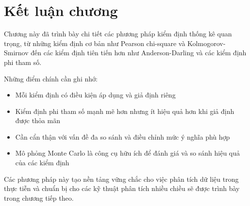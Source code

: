 \section{Kết luận chương}

Chương này đã trình bày chi tiết các phương pháp kiểm định thống kê quan trọng, từ những kiểm định cơ bản như Pearson chi-square và Kolmogorov-Smirnov đến các kiểm định tiên tiến hơn như Anderson-Darling và các kiểm định phi tham số. 

Những điểm chính cần ghi nhớ:
\begin{itemize}
    \item Mỗi kiểm định có điều kiện áp dụng và giả định riêng
    \item Kiểm định phi tham số mạnh mẽ hơn nhưng ít hiệu quả hơn khi giả định được thỏa mãn
    \item Cần cẩn thận với vấn đề đa so sánh và điều chỉnh mức ý nghĩa phù hợp
    \item Mô phỏng Monte Carlo là công cụ hữu ích để đánh giá và so sánh hiệu quả của các kiểm định
\end{itemize}

Các phương pháp này tạo nền tảng vững chắc cho việc phân tích dữ liệu trong thực tiễn và chuẩn bị cho các kỹ thuật phân tích nhiều chiều sẽ được trình bày trong chương tiếp theo.
